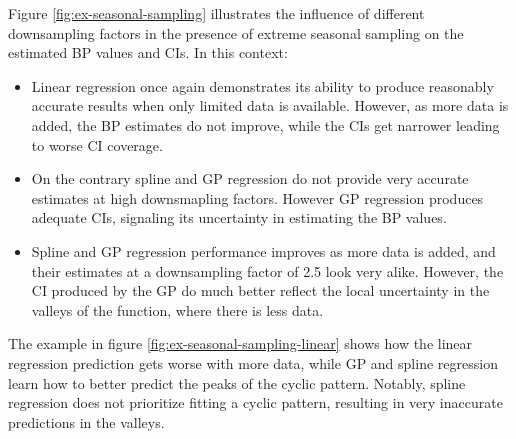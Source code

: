 Figure \ref{fig:ex-seasonal-sampling} illustrates the influence of different
downsampling factors in the presence of extreme seasonal sampling on the estimated
BP values and CIs. In this context:
\begin{itemize}
    \item Linear regression once again demonstrates its ability to produce
    reasonably accurate results when only limited data is available.
    However, as more data is added, the
    BP estimates do not improve, while the CIs get narrower leading to
    worse CI coverage.
    \item On the contrary spline and GP regression do not provide
    very accurate estimates at high downsmapling factors. However
    GP regression produces adequate CIs, signaling its uncertainty in
    estimating the BP values.
    \item Spline and GP regression performance improves as more data is added,
    and their estimates at a downsampling factor of 2.5 look very alike.
    However, the CI produced by the GP do much better reflect the local uncertainty
    in the valleys of the function, where there is less data.
\end{itemize}


The example in figure \ref{fig:ex-seasonal-sampling-linear} shows
how the linear regression prediction gets worse with more data, while
GP and spline regression learn how to better predict the peaks of the cyclic pattern.
Notably, spline regression does not prioritize fitting a cyclic pattern,
resulting in very inaccurate predictions in the valleys.


